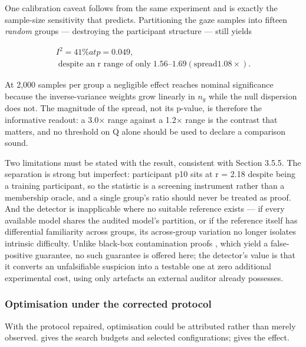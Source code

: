 One calibration caveat follows from the same experiment and is exactly the sample-size sensitivity that  predicts. Partitioning the gaze samples into fifteen \emph{random} groups --- destroying the participant structure --- still yields

\begin{equation}
\label{eq:183}
\begin{aligned}
I^{2} = 41 \% at p = 0.049 , \\
\;\text{despite an r range of only}\; 1.56\text{--}1.69 (\mathrm{spread} 1.08\times ) .
\end{aligned}
\end{equation}

At 2,000 samples per group a negligible effect reaches nominal significance because the inverse-variance weights grow linearly in $n_{g}$ while the null dispersion does not. The magnitude of the spread, not its p-value, is therefore the informative readout: a 3.0$\times$ range against a 1.2$\times$ range is the contrast that matters, and no threshold on Q alone should be used to declare a comparison sound.

Two limitations must be stated with the result, consistent with Section 3.5.5. The separation is strong but imperfect: participant p10 sits at r = 2.18 despite being a training participant, so the statistic is a screening instrument rather than a membership oracle, and a single group's ratio should never be treated as proof. And the detector is inapplicable where no suitable reference exists --- if every available model shares the audited model's partition, or if the reference itself has differential familiarity across groups, its across-group variation no longer isolates intrinsic difficulty. Unlike black-box contamination proofs , which yield a false-positive guarantee, no such guarantee is offered here; the detector's value is that it converts an unfalsifiable suspicion into a testable one at zero additional experimental cost, using only artefacts an external auditor already possesses.

\subsubsection{Optimisation under the corrected protocol}

With the protocol repaired, optimisation could be attributed rather than merely observed.  gives the search budgets and selected configurations;  gives the effect.

